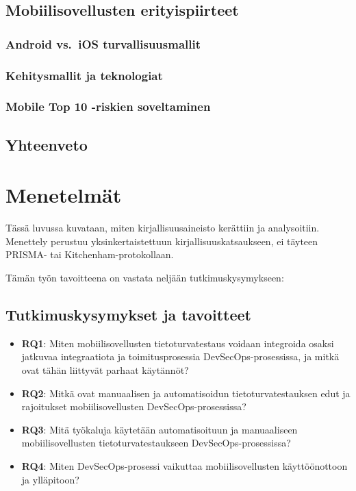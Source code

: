 \documentclass[bscthesis,finnish,oneside,biblatex]{uefcsthesis}
\begin{document}
\section{Mobiilisovellusten erityispiirteet}
\label{sec:mobile}
  \subsection{Android vs.\ iOS turvallisuusmallit}
  \subsection{Kehitysmallit ja teknologiat}
  \subsection{Mobile Top 10 -riskien soveltaminen}

\section{Yhteenveto}
\label{sec:teoria-yhteenveto}

\chapter{Menetelmät}
\label{cha:methods}

Tässä luvussa kuvataan, miten kirjallisuusaineisto kerättiin ja analysoitiin.
Menettely perustuu yksinkertaistettuun kirjallisuuskatsaukseen, ei täyteen
PRISMA- tai Kitchenham-protokollaan.

Tämän työn tavoitteena on vastata neljään tutkimuskysymykseen:

\section{Tutkimuskysymykset ja tavoitteet}
\label{sec:rq}
\begin{itemize}
  \item \textbf{RQ1}: Miten mobiilisovellusten tietoturvatestaus voidaan integroida osaksi jatkuvaa integraatiota ja toimitusprosessia DevSecOps-prosessissa, ja mitkä ovat tähän liittyvät parhaat käytännöt?
  \item \textbf{RQ2}: Mitkä ovat manuaalisen ja automatisoidun tietoturvatestauksen edut ja rajoitukset mobiilisovellusten DevSecOps-prosessissa?
  \item \textbf{RQ3}: Mitä työkaluja käytetään automatisoituun ja manuaaliseen mobiilisovellusten tietoturvatestaukseen DevSecOps-prosessissa?
  \item \textbf{RQ4}: Miten DevSecOps-prosessi vaikuttaa mobiilisovellusten käyttöönottoon ja ylläpitoon?
\end{itemize}
\end{document}
